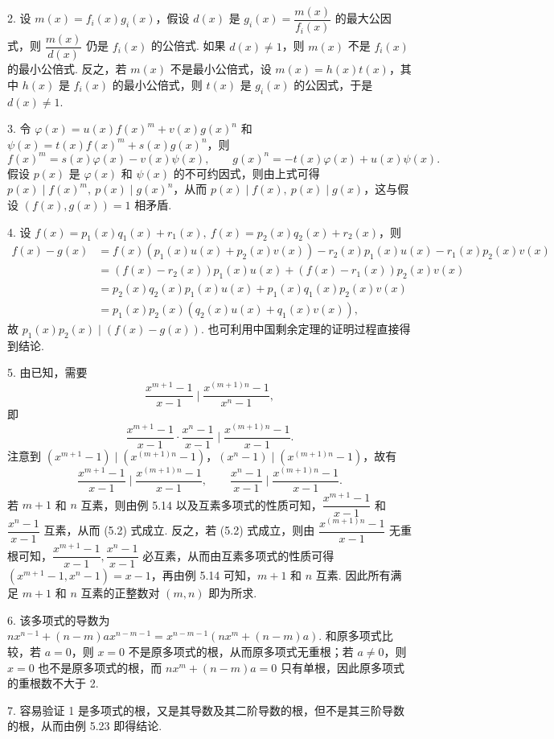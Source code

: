 \documentclass[UTF8, 12pt, fontset=fandol, oneside]{ctexart}
\begin{document}
2. 设 $m(x)=f_i(x)g_i(x)$，假设 $d(x)$ 是 $g_i(x)=\dfrac{m(x)}{f_i(x)}$ 的最大公因式，则 $\dfrac{m(x)}{d(x)}$ 仍是 $f_i(x)$ 的公倍式. 如果 $d(x)\ne1$，则 $m(x)$ 不是 $f_i(x)$ 的最小公倍式. 反之，若 $m(x)$ 不是最小公倍式，设 $m(x)=h(x)t(x)$，其中 $h(x)$ 是 $f_i(x)$ 的最小公倍式，则 $t(x)$ 是 $g_i(x)$ 的公因式，于是 $d(x)\ne1$.

3. 令 $\varphi(x)=u(x)f(x)^m+v(x)g(x)^n$ 和 $\psi(x)=t(x)f(x)^m+s(x)g(x)^n$，则
\[
f(x)^m=s(x)\varphi(x)-v(x)\psi(x),\qquad
g(x)^n=-t(x)\varphi(x)+u(x)\psi(x).
\]
假设 $p(x)$ 是 $\varphi(x)$ 和 $\psi(x)$ 的不可约因式，则由上式可得 $p(x)\mid f(x)^m,\ p(x)\mid g(x)^n$，从而 $p(x)\mid f(x),\ p(x)\mid g(x)$，这与假设 $(f(x),g(x))=1$ 相矛盾.

4. 设 $f(x)=p_1(x)q_1(x)+r_1(x),\ f(x)=p_2(x)q_2(x)+r_2(x)$，则
\[
\begin{aligned}
f(x)-g(x)
&=f(x)(p_1(x)u(x)+p_2(x)v(x))-r_2(x)p_1(x)u(x)-r_1(x)p_2(x)v(x)\\
&=(f(x)-r_2(x))p_1(x)u(x)+(f(x)-r_1(x))p_2(x)v(x)\\
&=p_2(x)q_2(x)p_1(x)u(x)+p_1(x)q_1(x)p_2(x)v(x)\\
&=p_1(x)p_2(x)(q_2(x)u(x)+q_1(x)v(x)),
\end{aligned}
\]
故 $p_1(x)p_2(x)\mid(f(x)-g(x))$. 也可利用中国剩余定理的证明过程直接得到结论.

5. 由已知，需要
\[
\frac{x^{m+1}-1}{x-1}\mid\frac{x^{(m+1)n}-1}{x^n-1},
\]
即
\[
\frac{x^{m+1}-1}{x-1}\cdot\frac{x^n-1}{x-1}\mid\frac{x^{(m+1)n}-1}{x-1}. \tag{5.2}
\]
注意到 $(x^{m+1}-1)\mid(x^{(m+1)n}-1)$，$(x^n-1)\mid(x^{(m+1)n}-1)$，故有
\[
\frac{x^{m+1}-1}{x-1}\mid\frac{x^{(m+1)n}-1}{x-1},\qquad
\frac{x^n-1}{x-1}\mid\frac{x^{(m+1)n}-1}{x-1}.
\]
若 $m+1$ 和 $n$ 互素，则由例 5.14 以及互素多项式的性质可知，$\dfrac{x^{m+1}-1}{x-1}$ 和 $\dfrac{x^n-1}{x-1}$ 互素，从而 (5.2) 式成立. 反之，若 (5.2) 式成立，则由 $\dfrac{x^{(m+1)n}-1}{x-1}$ 无重根可知，$\dfrac{x^{m+1}-1}{x-1},\dfrac{x^n-1}{x-1}$ 必互素，从而由互素多项式的性质可得 $(x^{m+1}-1,x^n-1)=x-1$，再由例 5.14 可知，$m+1$ 和 $n$ 互素. 因此所有满足 $m+1$ 和 $n$ 互素的正整数对 $(m,n)$ 即为所求.

6. 该多项式的导数为 $nx^{n-1}+(n-m)ax^{n-m-1}=x^{n-m-1}(nx^m+(n-m)a)$. 和原多项式比较，若 $a=0$，则 $x=0$ 不是原多项式的根，从而原多项式无重根；若 $a\ne0$，则 $x=0$ 也不是原多项式的根，而 $nx^m+(n-m)a=0$ 只有单根，因此原多项式的重根数不大于 2.

7. 容易验证 1 是多项式的根，又是其导数及其二阶导数的根，但不是其三阶导数的根，从而由例 5.23 即得结论.
\end{document}
